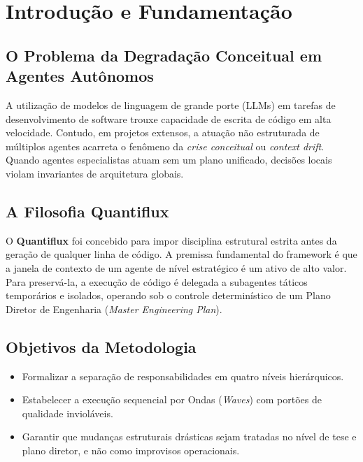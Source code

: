 \chapter{Introdução e Fundamentação}

\section{O Problema da Degradação Conceitual em Agentes Autônomos}
A utilização de modelos de linguagem de grande porte (LLMs) em tarefas de desenvolvimento de software trouxe capacidade de escrita de código em alta velocidade. Contudo, em projetos extensos, a atuação não estruturada de múltiplos agentes acarreta o fenômeno da \emph{crise conceitual} ou \emph{context drift}. Quando agentes especialistas atuam sem um plano unificado, decisões locais violam invariantes de arquitetura globais.

\section{A Filosofia Quantiflux}
O \textbf{Quantiflux} foi concebido para impor disciplina estrutural estrita antes da geração de qualquer linha de código. A premissa fundamental do framework é que a janela de contexto de um agente de nível estratégico é um ativo de alto valor. Para preservá-la, a execução de código é delegada a subagentes táticos temporários e isolados, operando sob o controle determinístico de um Plano Diretor de Engenharia (\emph{Master Engineering Plan}).

\section{Objetivos da Metodologia}
\begin{itemize}
    \item Formalizar a separação de responsabilidades em quatro níveis hierárquicos.
    \item Estabelecer a execução sequencial por Ondas (\emph{Waves}) com portões de qualidade invioláveis.
    \item Garantir que mudanças estruturais drásticas sejam tratadas no nível de tese e plano diretor, e não como improvisos operacionais.
\end{itemize}